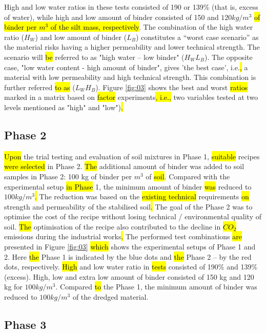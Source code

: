 \documentclass{amestyle}
\begin{document}
High and low water ratios in these tests consisted of 190 or 139\% (that is, excess of water), while high and low amount of binder consisted of 150 and $120 kg/m^3$ \hl{of binder per $m^3$ of the silt mass, respectively}. The combination of the high water ratio ($H_W$) and low amount of binder ($L_B$) constitutes a “worst case scenario” as the material risks having a higher permeability and lower technical strength. The scenario will \hl{be} referred to as "high water -- low binder" ($H_WL_B$). The opposite case, "low water content - high amount of binder", gives 'the best case', i.e.\hl{,} a material with low permeability and high technical strength. This combination is further referred \hl{to as }($L_WH_B$). Figure \ref{fig:03} shows the best and worst \hl{ratios} marked in a matrix based on \hl{factor} experiments\hl{, i.e.,} two variables tested at two levels mentioned as "high" and "low")\hl{.}

\subsection{Phase 2}

\hl{Upon} the trial testing and evaluation of soil mixtures in Phase 1, \hl{suitable} recipes \hl{were selected} in Phase 2. \hl{The} additional amount of binder was added to soil samples in Phase 2: 100 kg of binder per $m^3$ of \hl{soil}. Compared with the experimental setup \hl{in Phase} 1, the minimum amount of binder \hl{was} reduced to $100 kg/m^3$\hl{. }The reduction was based on the \hl{existing technical} requirements \hl{on} strength and permeability of the stabilised soil\hl{.} The goal of the Phase 2 was to optimise the cost of the recipe without losing technical / environmental quality of soil. \hl{The} optimisation of the recipe also contributed to the decline in \hl{$CO_2$} emissions during the industrial works\hl{.} The performed test combinations \hl{are} presented in Figure \ref{fig:03} \hl{which} shows the experimental setups of Phase 1 and 2. Here \hl{the} Phase 1 is indicated by the blue dots and \hl{the} Phase 2 -- by the red dots, respectively. \hl{High} and low water ratio in \hl{tests} consisted of 190\% and 139\% (excess). High, low and extra low amount of binder consisted of 150 kg and 120 kg for $100 kg/m^3$. Compared \hl{to} the Phase 1, the minimum amount of binder was reduced to $100 kg/m^3$ of the dredged material. 

\subsection{Phase 3}
\end{document}

